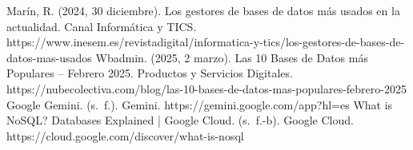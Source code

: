 \documentclass[12pt]{report}
\begin{document}
\begin{thebibliography}{99}
        Marín, R. (2024, 30 diciembre). Los gestores de bases de datos más usados en la actualidad. Canal Informática y TICS. https://www.inesem.es/revistadigital/informatica-y-tics/los-gestores-de-bases-de-datos-mas-usados
        Wbadmin. (2025, 2 marzo). Las 10 Bases de Datos más Populares – Febrero 2025. Productos y Servicios Digitales. https://nubecolectiva.com/blog/las-10-bases-de-datos-mas-populares-febrero-2025
        Google Gemini. (s. f.). Gemini. https://gemini.google.com/app?hl=es
        What is NoSQL? Databases Explained | Google Cloud. (s. f.-b). Google Cloud. https://cloud.google.com/discover/what-is-nosql

\end{thebibliography}
\end{document}
